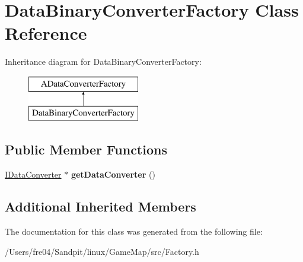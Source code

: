 \hypertarget{class_data_binary_converter_factory}{}\section{Data\+Binary\+Converter\+Factory Class Reference}
\label{class_data_binary_converter_factory}
Inheritance diagram for Data\+Binary\+Converter\+Factory\+:\begin{figure}[H]
\begin{center}
\leavevmode
\includegraphics[height=2.000000cm]{class_data_binary_converter_factory}
\end{center}
\end{figure}
\subsection*{Public Member Functions}
\begin{DoxyCompactItemize}
\item 
\hypertarget{class_data_binary_converter_factory_ad49ce275683858120f00fda265cd1fa4}{}\hyperlink{class_i_data_converter}{I\+Data\+Converter} $\ast$ {\bfseries get\+Data\+Converter} ()\label{class_data_binary_converter_factory_ad49ce275683858120f00fda265cd1fa4}

\end{DoxyCompactItemize}
\subsection*{Additional Inherited Members}


The documentation for this class was generated from the following file\+:\begin{DoxyCompactItemize}
\item 
/\+Users/fre04/\+Sandpit/linux/\+Game\+Map/src/Factory.\+h\end{DoxyCompactItemize}
